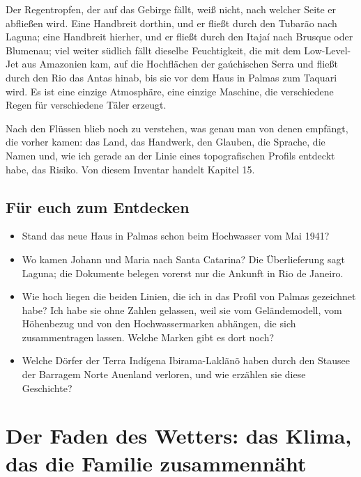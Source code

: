 \documentclass[
  ngerman,
  11pt,
  openany]{book}
\providecommand{\tightlist}{%
  \setlength{\itemsep}{0pt}\setlength{\parskip}{0pt}}
\begin{document}
Der Regentropfen, der auf das Gebirge fällt, weiß nicht, nach welcher
Seite er abfließen wird. Eine Handbreit dorthin, und er fließt durch den
Tubarão nach Laguna; eine Handbreit hierher, und er fließt durch den
Itajaí nach Brusque oder Blumenau; viel weiter südlich fällt dieselbe
Feuchtigkeit, die mit dem Low-Level-Jet aus Amazonien kam, auf die
Hochflächen der gaúchischen Serra und fließt durch den Rio das Antas
hinab, bis sie vor dem Haus in Palmas zum Taquari wird. Es ist eine
einzige Atmosphäre, eine einzige Maschine, die verschiedene Regen für
verschiedene Täler erzeugt.

Nach den Flüssen blieb noch zu verstehen, was genau man von denen
empfängt, die vorher kamen: das Land, das Handwerk, den Glauben, die
Sprache, die Namen und, wie ich gerade an der Linie eines topografischen
Profils entdeckt habe, das Risiko. Von diesem Inventar handelt Kapitel
15.

\section{Für euch zum Entdecken}\label{fuxfcr-euch-zum-entdecken-12}

\begin{itemize}
\tightlist
\item
  Stand das neue Haus in Palmas schon beim Hochwasser vom Mai 1941?
\item
  Wo kamen Johann und Maria nach Santa Catarina? Die Überlieferung sagt
  Laguna; die Dokumente belegen vorerst nur die Ankunft in Rio de
  Janeiro.
\item
  Wie hoch liegen die beiden Linien, die ich in das Profil von Palmas
  gezeichnet habe? Ich habe sie ohne Zahlen gelassen, weil sie vom
  Geländemodell, vom Höhenbezug und von den Hochwassermarken abhängen,
  die sich zusammentragen lassen. Welche Marken gibt es dort noch?
\item
  Welche Dörfer der Terra Indígena Ibirama-Laklãnõ haben durch den
  Stausee der Barragem Norte Auenland verloren, und wie erzählen sie
  diese Geschichte?
\end{itemize}

\chapter{Der Faden des Wetters: das Klima, das die Familie
zusammennäht}\label{cap-14}
\end{document}
